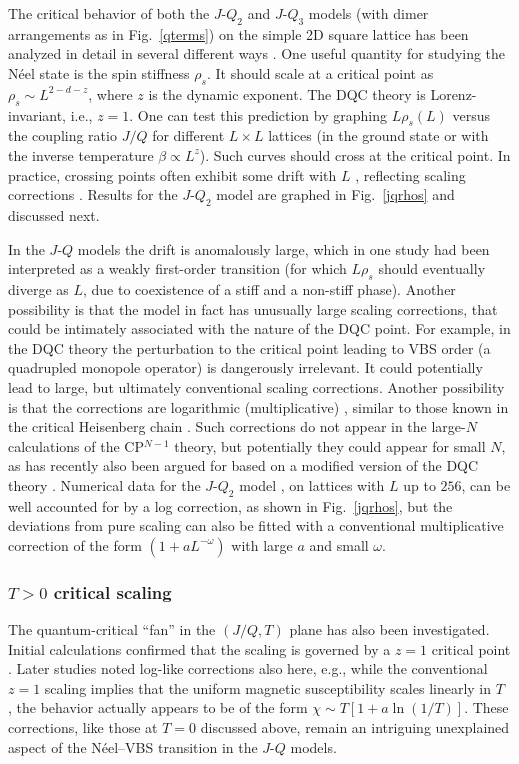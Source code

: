 \documentclass[range]{ar2e}
\begin{document}
The critical behavior of both the $J$-$Q_2$ and $J$-$Q_3$ models (with dimer arrangements as in Fig.~\ref{qterms}) on the simple 2D square 
lattice has been analyzed in detail in several different ways \cite{Sandvik07,Jiang08,melko2008:jq,lou2009:sun,Sandvik10c}. One useful quantity 
for studying the N\'eel state is the spin stiffness $\rho_s$. It should scale at a critical point as $\rho_s \sim L^{2-d-z}$, 
where $z$ is the dynamic exponent. The DQC theory is Lorenz-invariant, i.e., $z=1$. One can test this prediction by graphing 
$L\rho_s(L)$ versus the coupling ratio $J/Q$ for different $L\times L$ lattices (in the ground state or with the inverse temperature $\beta \propto L^z$). 
Such curves should cross at the critical point. In practice, crossing points often exhibit some drift with $L$ \cite{melko2008:jq}, reflecting scaling 
corrections \cite{Sandvik10c}. Results for the $J$-$Q_2$ model are graphed in Fig.~\ref{jqrhos} and discussed next.

In the $J$-$Q$ models the drift is anomalously large, which in one study \cite{Jiang08} had been interpreted as a weakly first-order transition (for which 
$L\rho_s$ should eventually diverge as $L$, due to coexistence of a stiff and a non-stiff phase). Another possibility is that the model in fact has unusually
large scaling corrections, that could be intimately associated with the nature of the DQC point. For example, in the DQC theory the perturbation to the 
critical point leading to VBS order (a quadrupled monopole operator) is dangerously irrelevant. It could potentially lead to large, but ultimately conventional
scaling corrections. Another possibility is that the corrections are logarithmic (multiplicative) \cite{Sandvik10c,banerjee2010:log}, similar to those known 
in the critical Heisenberg chain \cite{Giamarchi89}. Such corrections do not appear in the large-$N$ calculations of the CP$^{N-1}$ theory, but potentially they could 
appear for small $N$, as has recently also been argued for based on a modified version of the DQC theory \cite{Nogueira11}. Numerical data for the $J$-$Q_2$ 
model \cite{Sandvik10c}, on lattices with $L$ up to $256$, can be well accounted for by a log correction, as shown in Fig.~\ref{jqrhos}, but the 
deviations from pure scaling can also be fitted with a conventional multiplicative correction of the form $(1+aL^{-\omega})$ with large $a$ and small $\omega$.

\subsubsection{$T>0$ critical scaling} The quantum-critical ``fan'' in the $(J/Q,T)$ plane has also been investigated. Initial calculations confirmed that
the scaling is governed by a $z=1$ critical point \cite{melko2008:jq}. Later studies \cite{Sandvik10c,Sandvik11a} noted log-like corrections also here, e.g., 
while the conventional $z=1$ scaling implies that the uniform magnetic susceptibility scales linearly in $T$ \cite{Chakravarty89}, the behavior actually appears 
to be of the form $\chi \sim T[1+a\ln(1/T)]$. These corrections, like those at $T=0$ discussed above, remain an intriguing unexplained aspect of the N\'eel--VBS 
transition in the $J$-$Q$ models.
\end{document}
